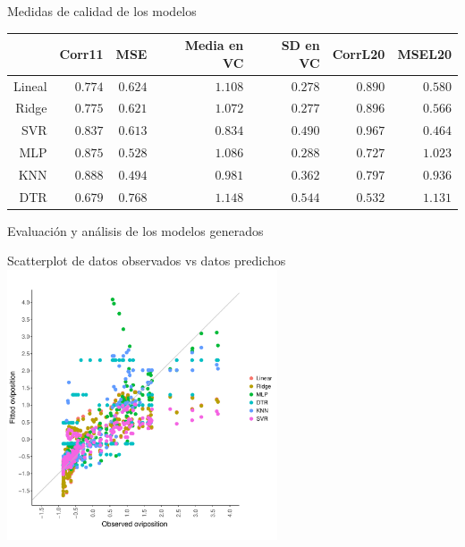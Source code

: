 \documentclass[10pt]{beamer}
\begin{document}
\begin{frame}
  \centering
  Medidas de calidad de los modelos
  \begin{tabular}{*7{r}}
  \toprule
  & Corr11
  & MSE
  & Media en VC
  & SD en VC
  & CorrL20
  & MSEL20 \\ \midrule
  Lineal
  &$0.774$
  &$0.624$
  &$1.108$%
  &$0.278$
  &$0.890$
  &$0.580$\\
  Ridge
  &$0.775$
  &$0.621$
  &$1.072$
  &$0.277$
  &$0.896$
  &$0.566$ \\
  SVR
  &$0.837$
  &$0.613$
  &\boldmath$0.834$   %
  &$0.490$
  &\boldmath$0.967$
  &\boldmath$0.464$ \\
  MLP
  &$0.875$
  &$0.528$
  &$1.086$
  &$0.288$
  &$0.727$
  &$1.023$ \\
  KNN
  &\boldmath$0.888$
  &\boldmath$0.494$
  &$0.981$
  &$0.362$
  &$0.797$
  &$0.936$\\
  DTR
  &$0.679$
  &$0.768$
  &$1.148$
  &$0.544$
  &$0.532$
  &$1.131$ \\
  \bottomrule
  \end{tabular}

\end{frame}


\begin{frame}{Evaluación y análisis de los modelos generados}
  \begin{center}
    Scatterplot de datos observados vs datos predichos
    \includegraphics[width=0.6\textwidth]{scatterplot}
  \end{center}
\end{frame}
\end{document}
